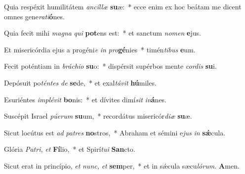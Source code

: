 \item Quia respéxit humilitátem \textit{ancíllæ} \textbf{su}æ:~* ecce enim ex hoc beátam me dicent omnes gene\textit{rati}\textbf{ó}nes.
\item Quia fecit mihi \textit{magna} \textit{qui} \textbf{pot}ens est:~* et sanctum \textit{nomen} \textbf{e}jus.
\item Et misericórdia ejus a progéni\textit{e} \textit{in} \textit{pro}\textbf{gé}nies~* timén\textit{tibus} \textbf{e}um.
\item Fecit poténtiam in \textit{bráchio} \textbf{su}o:~* dispérsit supérbos mente \textit{cordis} \textbf{su}i.
\item Depósuit po\textit{téntes} \textit{de} \textbf{se}de,~* et exal\textit{távit} \textbf{hú}miles.
\item Esuriéntes \textit{implévit} \textbf{bo}nis:~* et dívites dimí\tinyhspace\textit{sit} \textit{in}\textbf{á}nes.
\item Suscépit Israel \textit{púerum} \textbf{su}um,~* recordátus misericór\textit{diæ} \textbf{su}æ.
\item Sicut locútus est \textit{ad} \textit{patres} \textbf{no}stros,~* Abraham et sémini e\hspace*{0.02em}\textit{jus} \textit{in} \textbf{sǽ}cula.
\item Glória \textit{Patri,} \textit{et} \textbf{Fí}lio,~* et Spirí\tinyhspace\textit{tu}\textit{i} \textbf{San}cto.
\item Sicut erat in princípio, \textit{et} \textit{nunc,} \textit{et} \textbf{sem}per,~* et in sǽcula sæcu\tinyhspace\textit{lórum.} \textbf{A}men.